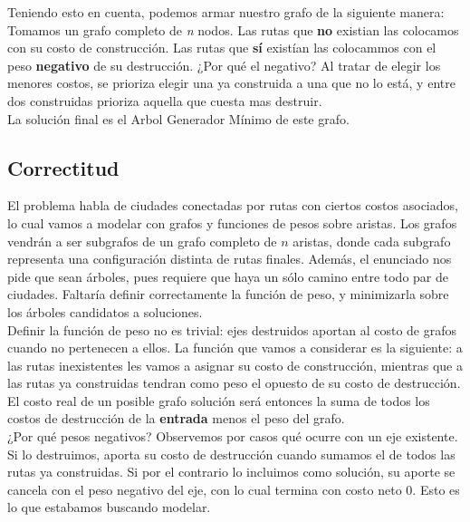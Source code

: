 Teniendo esto en cuenta, podemos armar nuestro grafo de la siguiente manera: \\

Tomamos un grafo completo de \textit{n} nodos. Las rutas que \textbf{no} existian las colocamos con su costo de construcción. Las rutas que \textbf{sí} existían las colocammos con el peso \textbf{negativo} de su destrucción. ¿Por qué el negativo? Al tratar de elegir los menores costos, se prioriza elegir una ya construida a una que no lo está, y entre dos construidas prioriza aquella que cuesta mas destruir. \\

La solución final es el Arbol Generador Mínimo de este grafo. \\


\subsection{Correctitud}
El problema habla de ciudades conectadas por rutas con ciertos costos asociados, lo cual vamos a modelar con grafos y funciones de pesos sobre aristas. Los grafos vendrán a ser subgrafos de un grafo completo de $n$ aristas, donde cada subgrafo representa una configuración distinta de rutas finales. Además, el enunciado nos pide que sean árboles, pues requiere que haya un sólo camino entre todo par de ciudades. Faltaría definir correctamente la función de peso, y minimizarla sobre los árboles candidatos a soluciones. \\

Definir la función de peso no es trivial: ejes destruidos aportan al costo de grafos cuando no pertenecen a ellos. La función que vamos a considerar es la siguiente: a las rutas inexistentes les vamos a asignar su costo de construcción, mientras que a las rutas ya construidas tendran como peso el opuesto de su costo de destrucción. El costo real de un posible grafo solución será entonces la suma de todos los costos de destrucción de la \textbf{entrada} menos el peso del grafo. \\

¿Por qué pesos negativos? Observemos por casos qué ocurre con un eje existente. Si lo destruimos, aporta su costo de destrucción cuando sumamos el de todos las rutas ya construidas. Si por el contrario lo incluimos como solución, su aporte se cancela con el peso negativo del eje, con lo cual termina con costo neto 0. Esto es lo que estabamos buscando modelar. \\


